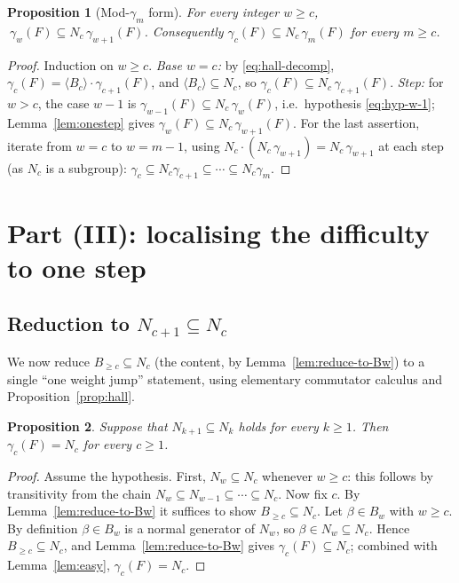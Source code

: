 \documentclass{amsart}
\newtheorem{proposition}{Proposition}
\theoremstyle{definition}
\theoremstyle{remark}
\begin{document}
\begin{proposition}[Mod-$\gamma_m$ form]\label{prop:moddescent}
For every integer $w\ge c$, $\ \gamma_w(F)\subseteq N_c\,\gamma_{w+1}(F)$.
Consequently $\gamma_c(F)\subseteq N_c\,\gamma_m(F)$ for every $m\ge c$.
\end{proposition}

\begin{proof}
Induction on $w\ge c$. \emph{Base $w=c$:} by \eqref{eq:hall-decomp},
$\gamma_c(F)=\langle B_c\rangle\cdot\gamma_{c+1}(F)$, and $\langle B_c\rangle
\subseteq N_c$, so $\gamma_c(F)\subseteq N_c\,\gamma_{c+1}(F)$. \emph{Step:} for
$w>c$, the case $w-1$ is $\gamma_{w-1}(F)\subseteq N_c\,\gamma_{w}(F)$, i.e.\
hypothesis \eqref{eq:hyp-w-1}; Lemma~\ref{lem:onestep} gives $\gamma_w(F)\subseteq
N_c\,\gamma_{w+1}(F)$. For the last assertion, iterate from $w=c$ to $w=m-1$, using
$N_c\cdot(N_c\,\gamma_{w+1})=N_c\,\gamma_{w+1}$ at each step (as $N_c$ is a
subgroup): $\gamma_c\subseteq N_c\gamma_{c+1}\subseteq\cdots\subseteq N_c\gamma_m$.
\end{proof}

\section{Part (III): localising the difficulty to one step}\label{sec:reduce}

\subsection{Reduction to $N_{c+1}\subseteq N_c$}

We now reduce $B_{\ge c}\subseteq N_c$ (the content, by
Lemma~\ref{lem:reduce-to-Bw}) to a single ``one weight jump'' statement, using
elementary commutator calculus and Proposition~\ref{prop:hall}.

\begin{proposition}\label{prop:reduce}
Suppose that $N_{k+1}\subseteq N_k$ holds for every $k\ge1$. Then $\gamma_c(F)=N_c$
for every $c\ge1$.
\end{proposition}

\begin{proof}
Assume the hypothesis. First, $N_{w}\subseteq N_c$ whenever $w\ge c$: this follows
by transitivity from the chain $N_{w}\subseteq N_{w-1}\subseteq\cdots\subseteq
N_c$. Now fix $c$. By Lemma~\ref{lem:reduce-to-Bw} it suffices to show
$B_{\ge c}\subseteq N_c$. Let $\beta\in B_w$ with $w\ge c$. By definition
$\beta\in B_w$ is a normal generator of $N_w$, so $\beta\in N_w\subseteq N_c$.
Hence $B_{\ge c}\subseteq N_c$, and Lemma~\ref{lem:reduce-to-Bw} gives
$\gamma_c(F)\subseteq N_c$; combined with Lemma~\ref{lem:easy},
$\gamma_c(F)=N_c$.
\end{proof}
\end{document}
